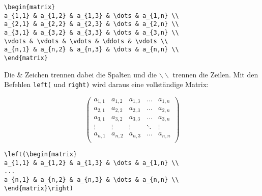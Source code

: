 \begin{verbatim}
\begin{matrix}
a_{1,1} & a_{1,2} & a_{1,3} & \dots & a_{1,n} \\
a_{2,1} & a_{2,2} & a_{2,3} & \dots & a_{2,n} \\
a_{3,1} & a_{3,2} & a_{3,3} & \dots & a_{3,n} \\
\vdots & \vdots & \vdots & \ddots & \vdots \\
a_{n,1} & a_{n,2} & a_{n,3} & \dots & a_{n,n} \\
\end{matrix}
\end{verbatim}

Die \& Zeichen trennen dabei die Spalten und die $\backslash\backslash$ trennen die Zeilen. Mit den Befehlen  \texttt{left(} und \texttt{right)} wird daraus eine vollständige Matrix:

\begin{equation*}
\left(\begin{matrix}
a_{1,1} & a_{1,2} & a_{1,3} & \dots & a_{1,n} \\
a_{2,1} & a_{2,2} & a_{2,3} & \dots & a_{2,n} \\
a_{3,1} & a_{3,2} & a_{3,3} & \dots & a_{3,n} \\
\vdots & \vdots & \vdots & \ddots & \vdots \\
a_{n,1} & a_{n,2} & a_{n,3} & \dots & a_{n,n} \\
\end{matrix}\right)
\end{equation*}

\begin{verbatim}
\left(\begin{matrix}
a_{1,1} & a_{1,2} & a_{1,3} & \dots & a_{1,n} \\
...
a_{n,1} & a_{n,2} & a_{n,3} & \dots & a_{n,n} \\
\end{matrix}\right)
\end{verbatim}

